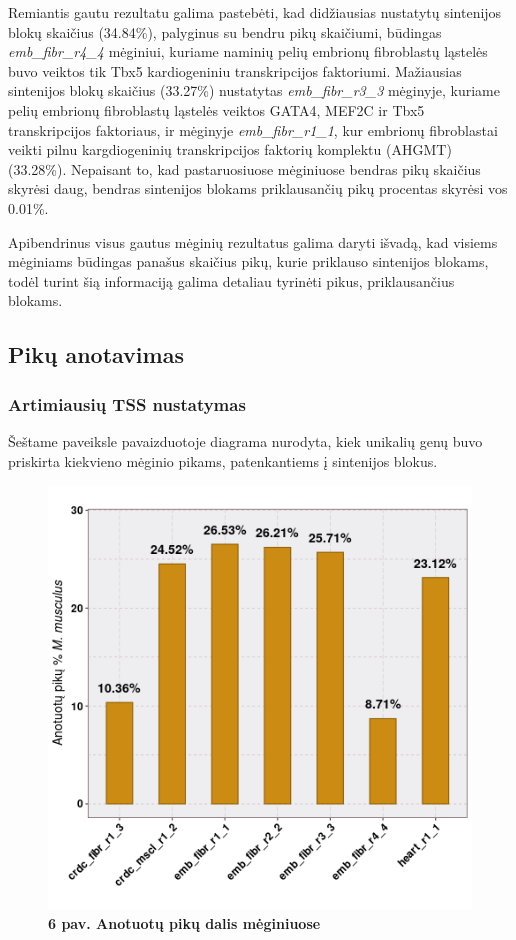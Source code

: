 \documentclass[12pt]{article}
\begin{document}
Remiantis gautu rezultatu galima pastebėti, kad didžiausias nustatytų sintenijos
blokų skaičius (34.84\%), palyginus su bendru pikų skaičiumi, būdingas
\emph{emb\_fibr\_r4\_4} mėginiui, kuriame naminių pelių embrionų fibroblastų
ląstelės buvo veiktos tik Tbx5 kardiogeniniu transkripcijos faktoriumi.
Mažiausias sintenijos blokų skaičius (33.27\%) nustatytas
\emph{emb\_fibr\_r3\_3} mėginyje, kuriame pelių embrionų fibroblastų ląstelės
veiktos GATA4, MEF2C ir Tbx5 transkripcijos faktoriaus, ir mėginyje
\emph{emb\_fibr\_r1\_1}, kur embrionų fibroblastai veikti pilnu kargdiogeninių
transkripcijos faktorių komplektu (AHGMT) (33.28\%). Nepaisant to, kad
pastaruosiuose mėginiuose bendras pikų skaičius skyrėsi daug, bendras sintenijos
blokams priklausančių pikų procentas skyrėsi vos 0.01\%.

Apibendrinus visus gautus mėginių rezultatus galima daryti išvadą, kad visiems
mėginiams būdingas panašus skaičius pikų, kurie priklauso sintenijos blokams,
todėl turint šią informaciją galima detaliau tyrinėti pikus, priklausančius
blokams.

\subsection{Pikų anotavimas}
\subsubsection{Artimiausių TSS nustatymas}
Šeštame paveiksle pavaizduotoje diagrama nurodyta, kiek unikalių genų buvo
priskirta kiekvieno mėginio pikams, patenkantiems į sintenijos blokus.

\begin{figure}[htb]
    \begin{center}
        \includegraphics[width=0.7\linewidth]{../Figures/Unique_genes_MM.png}
        \vspace{-2\baselineskip}
        \caption*{\small\textbf{6 pav. Anotuotų pikų dalis mėginiuose}}
        \label{fig:birds}
    \end{center}
\end{figure}
\end{document}
